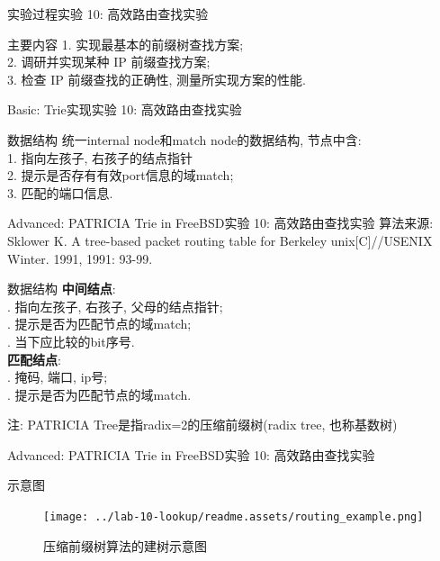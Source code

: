 \documentclass{beamer}
\begin{document}
\begin{frame}{实验过程}{实验 10: 高效路由查找实验}
    \begin{block}{主要内容}
        1. 实现最基本的前缀树查找方案;\\
        2. 调研并实现某种 IP 前缀查找方案;\\
        3. 检查 IP 前缀查找的正确性, 测量所实现方案的性能.
    \end{block}
\end{frame}
\begin{frame}{Basic: Trie实现}{实验 10: 高效路由查找实验}
    \begin{block}{数据结构}
        统一internal node和match node的数据结构, 节点中含:\\
        1. 指向左孩子, 右孩子的结点指针\\
        2. 提示是否存有有效port信息的域match;\\
        3. 匹配的端口信息.
    \end{block}
\end{frame}
\begin{frame}{Advanced: PATRICIA Trie in FreeBSD}{实验 10: 高效路由查找实验}
    算法来源: Sklower K. A tree-based packet routing table
    for Berkeley unix[C]//USENIX Winter. 1991, 1991: 93-99.
    \begin{block}{数据结构}
        \textbf{中间结点}:\\
        . 指向左孩子, 右孩子, 父母的结点指针;\\
        . 提示是否为匹配节点的域match;\\
        . 当下应比较的bit序号.\\
        \textbf{匹配结点}:\\
        . 掩码, 端口, ip号;\\
        . 提示是否为匹配节点的域match.
    \end{block}
    注: PATRICIA Tree是指radix=2的压缩前缀树(radix tree, 也称基数树)
\end{frame}
\begin{frame}{Advanced: PATRICIA Trie in FreeBSD}{实验 10: 高效路由查找实验}
    \begin{block}{示意图}
        \begin{figure}[h]
            \centering %
            \texttt{[image: 
                ../lab-10-lookup/readme.assets/routing\_example.png]}
            \caption{压缩前缀树算法的建树示意图} %
        \end{figure}
    \end{block}
\end{frame}
\end{document}
